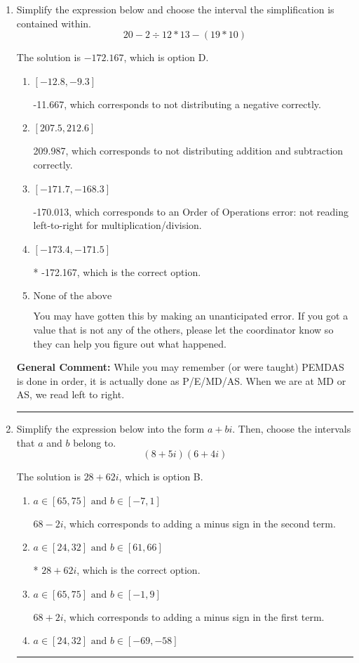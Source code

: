 \documentclass{extbook}[14pt]
\newcommand{\litem}[1]{\item #1

\rule{\textwidth}{0.4pt}}
\begin{document}
\begin{enumerate}\litem{
Simplify the expression below and choose the interval the simplification is contained within.
\[ 20 - 2 \div 12 * 13 - (19 * 10) \]

The solution is \( -172.167 \), which is option D.\begin{enumerate}[label=\Alph*.]
\item \( [-12.8, -9.3] \)

 -11.667, which corresponds to not distributing a negative correctly.
\item \( [207.5, 212.6] \)

 209.987, which corresponds to not distributing addition and subtraction correctly.
\item \( [-171.7, -168.3] \)

 -170.013, which corresponds to an Order of Operations error: not reading left-to-right for multiplication/division.
\item \( [-173.4, -171.5] \)

* -172.167, which is the correct option.
\item \( \text{None of the above} \)

 You may have gotten this by making an unanticipated error. If you got a value that is not any of the others, please let the coordinator know so they can help you figure out what happened.
\end{enumerate}

\textbf{General Comment:} While you may remember (or were taught) PEMDAS is done in order, it is actually done as P/E/MD/AS. When we are at MD or AS, we read left to right.
}
\litem{
Simplify the expression below into the form $a+bi$. Then, choose the intervals that $a$ and $b$ belong to.
\[ (8 + 5 i)(6 + 4 i) \]

The solution is \( 28 + 62 i \), which is option B.\begin{enumerate}[label=\Alph*.]
\item \( a \in [65, 75] \text{ and } b \in [-7, 1] \)

 $68 - 2 i$, which corresponds to adding a minus sign in the second term.
\item \( a \in [24, 32] \text{ and } b \in [61, 66] \)

* $28 + 62 i$, which is the correct option.
\item \( a \in [65, 75] \text{ and } b \in [-1, 9] \)

 $68 + 2 i$, which corresponds to adding a minus sign in the first term.
\item \( a \in [24, 32] \text{ and } b \in [-69, -58] \)


\end{enumerate}}
\end{enumerate}
\end{document}
